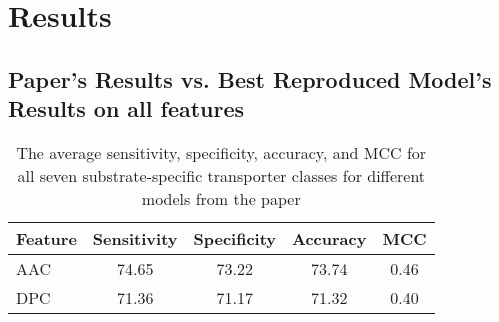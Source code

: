 \section {Results}
\subsection{Paper's Results vs. Best Reproduced Model's Results on all features}

    \begin{table}[h]
        \centering
        \begin{tabular}{p{3.5cm}|c|c|c|c}
            
            Feature&Sensitivity&Specificity&Accuracy&MCC\\ \cline{2-4}
            \hline \hline
            AAC&74.65&73.22&73.74&0.46\\
            DPC&71.36&71.17&71.32&0.40\\
            
        \end{tabular}
        \captionsetup{font=footnotesize,width=10cm}
        \caption{The average sensitivity, specificity, accuracy, and MCC for all seven 
        substrate-specific transporter classes for different models from the paper}
        \label{tab:table1}
    \end{table}